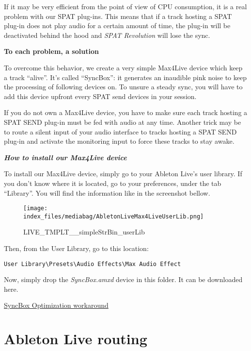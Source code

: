 \documentclass[
  letterpaper,
  DIV=11,
  numbers=noendperiod]{scrreport}
\begin{document}
If it may be very efficient from the point of view of CPU consumption,
it is a real problem with our SPAT plug-ins. This means that if a track
hosting a SPAT plug-in does not play audio for a certain amount of time,
the plug-in will be deactivated behind the hood and \emph{SPAT
Revolution} will lose the sync.

\textbf{To each problem, a solution}

To overcome this behavior, we create a very simple Max4Live device which
keep a track ``alive''. It's called ``SyncBox'': it generates an
inaudible pink noise to keep the processing of following devices on. To
unsure a steady sync, you will have to add this device upfront every
SPAT send devices in your session.

If you do not own a Max4Live device, you have to make sure each track
hosting a SPAT SEND plug-in must be fed with audio at any time. Another
trick may be to route a silent input of your audio interface to tracks
hosting a SPAT SEND plug-in and activate the monitoring input to force
these tracks to stay awake.

\textbf{\emph{How to install our Max4Live device}}

To install our Max4Live device, simply go to your Ableton Live's user
library. If you don't know where it is located, go to your preferences,
under the tab ``Library''. You will find the information like in the
screenshot bellow.

\begin{figure}

{\centering \texttt{[image: index\_files/mediabag/AbletonLiveMax4LiveUserLib.png]}

}

\caption{LIVE\_TMPLT\_\_simpleStrBin\_userLib}

\end{figure}

Then, from the User Library, go to this location:

\texttt{User\ Library\textbackslash{}Presets\textbackslash{}Audio\ Effects\textbackslash{}Max\ Audio\ Effect}

Now, simply drop the \emph{SyncBox.amxd} device in this folder. It can
be downloaded here.

\href{https://public.3.basecamp.com/p/UzFGokKV5483RXDxY5RpCifX}{SyncBox
Optimization workaround}

\hypertarget{ableton-live-routing}{%
\section{Ableton Live routing}\label{ableton-live-routing}}
\end{document}
